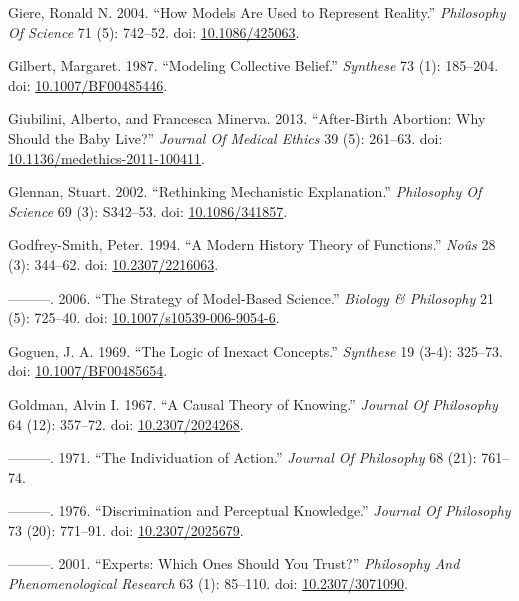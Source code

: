 \documentclass[
  10pt,
  letterpaper,
  DIV=11,
  numbers=noendperiod,
  twoside]{scrartcl}
\newlength{\cslhangindent}
\newenvironment{CSLReferences}[2] %
 {\begin{list}{}{%
  \setlength{\itemindent}{0pt}
  \setlength{\leftmargin}{0pt}
  \setlength{\parsep}{0pt}
  \ifodd #1
   \setlength{\leftmargin}{\cslhangindent}
   \setlength{\itemindent}{-1\cslhangindent}
  \fi
  \setlength{\itemsep}{#2\baselineskip}}}
 {\end{list}}
\begin{document}
\begin{CSLReferences}{1}{0}
Giere, Ronald N. 2004. {``How Models Are Used to Represent Reality.''}
\emph{Philosophy Of Science} 71 (5): 742--52. doi:
\href{https://doi.org/10.1086/425063}{10.1086/425063}.

Gilbert, Margaret. 1987. {``Modeling Collective Belief.''}
\emph{Synthese} 73 (1): 185--204. doi:
\href{https://doi.org/10.1007/BF00485446}{10.1007/BF00485446}.

Giubilini, Alberto, and Francesca Minerva. 2013. {``After-Birth
Abortion: Why Should the Baby Live?''} \emph{Journal Of Medical Ethics}
39 (5): 261--63. doi:
\href{https://doi.org/10.1136/medethics-2011-100411}{10.1136/medethics-2011-100411}.

Glennan, Stuart. 2002. {``Rethinking Mechanistic Explanation.''}
\emph{Philosophy Of Science} 69 (3): S342--53. doi:
\href{https://doi.org/10.1086/341857}{10.1086/341857}.

Godfrey-Smith, Peter. 1994. {``A Modern History Theory of Functions.''}
\emph{Noûs} 28 (3): 344--62. doi:
\href{https://doi.org/10.2307/2216063}{10.2307/2216063}.

---------. 2006. {``The Strategy of Model-Based Science.''}
\emph{Biology \& Philosophy} 21 (5): 725--40. doi:
\href{https://doi.org/10.1007/s10539-006-9054-6}{10.1007/s10539-006-9054-6}.

Goguen, J. A. 1969. {``The Logic of Inexact Concepts.''} \emph{Synthese}
19 (3-4): 325--73. doi:
\href{https://doi.org/10.1007/BF00485654}{10.1007/BF00485654}.

Goldman, Alvin I. 1967. {``A Causal Theory of Knowing.''} \emph{Journal
Of Philosophy} 64 (12): 357--72. doi:
\href{https://doi.org/10.2307/2024268}{10.2307/2024268}.

---------. 1971. {``The Individuation of Action.''} \emph{Journal Of
Philosophy} 68 (21): 761--74.

---------. 1976. {``Discrimination and Perceptual Knowledge.''}
\emph{Journal Of Philosophy} 73 (20): 771--91. doi:
\href{https://doi.org/10.2307/2025679}{10.2307/2025679}.

---------. 2001. {``Experts: Which Ones Should You Trust?''}
\emph{Philosophy And Phenomenological Research} 63 (1): 85--110. doi:
\href{https://doi.org/10.2307/3071090}{10.2307/3071090}.


\end{CSLReferences}
\end{document}

